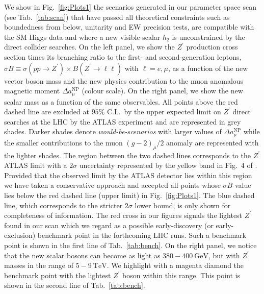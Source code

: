 We show in Fig.~\ref{fig:Plots1} the scenarios generated in our parameter space scan (see Tab.~\ref{tab:scan}) that have passed all theoretical constraints such as boundedness from below, unitarity and EW precision tests, are compatible with the SM Higgs data and where a new visible scalar $h_2$ is unconstrained by the direct collider searches. On the left panel, we show the $Z^\prime$ production cross section times its branching ratio to the first- and second-generation leptons, $\sigma B \equiv \sigma \left( pp \to Z^\prime \right) \times B \left( Z^\prime \to \ell \ell \right) $ with $\ell = e,\mu$, as a function of the new vector boson mass and the new physics contribution to the muon anomalous magnetic moment $\Delta a^{\textrm{NP}}_\mu$ (colour scale). On the right panel, we show the new scalar mass as a function of the same observables. All points above the red dashed line are excluded at $95\%$ C.L.~by the upper expected limit on $Z^\prime$ direct searches at the LHC by the ATLAS experiment and are represented in grey shades. Darker shades denote \textit{would-be-scenarios} with larger values of $\Delta a^{\textrm{NP}}_\mu$ while the smaller contributions to the muon $\left(g-2\right)_\mu / 2$ anomaly are represented with the lighter shades. The region between the two dashed lines corresponds to the $Z^\prime$ ATLAS limit with a $2\sigma$ uncertainty represented by the yellow band in Fig.~4 of \cite{Aaboud:2017buh}. Provided that the observed limit by the ATLAS detector lies within this region we have taken a conservative approach and accepted all points whose $\sigma B$ value lies below the red dashed line (upper limit) in Fig.~\ref{fig:Plots1}. The blue dashed line, which corresponds to the stricter $2 \sigma$ lower bound, is only shown for completeness of information. The red cross in our figures signals the lightest $Z^\prime$ found in our scan which we regard as a possible early-discovery (or early-exclusion) benchmark point in the forthcoming LHC runs. Such a benchmark point is shown in the first line of Tab.~\ref{tab:bench}. On the right panel, we notice that the new scalar bosons can become as light as $380 - 400~\textrm{GeV}$, but with $Z^\prime$ masses in the range of $5 - 9~\textrm{TeV}$. We highlight with a magenta diamond the benchmark point with the lightest $Z^\prime$ boson within this range. This point is shown in the second line of Tab.~\ref{tab:bench}.
%
